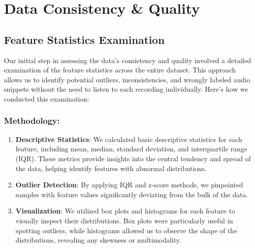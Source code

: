 \section{Data Consistency \& Quality}

\subsection{Feature Statistics Examination}

Our initial step in assessing the data's consistency and quality involved a detailed examination of the feature statistics across the entire dataset. This approach allows us to identify potential outliers, inconsistencies, and wrongly labeled audio snippets without the need to listen to each recording individually. Here's how we conducted this examination:

\subsubsection{Methodology:}

\begin{enumerate}
    \item \textbf{Descriptive Statistics}: We calculated basic descriptive statistics for each feature, including mean, median, standard deviation, and interquartile range (IQR). These metrics provide insights into the central tendency and spread of the data, helping identify features with abnormal distributions.
    \item \textbf{Outlier Detection}: By applying IQR and z-score methods, we pinpointed samples with feature values significantly deviating from the bulk of the data.
    \item \textbf{Visualization}: We utilized box plots and histograms for each feature to visually inspect their distributions. Box plots were particularly useful in spotting outliers, while histograms allowed us to observe the shape of the distributions, revealing any skewness or multimodality.
\end{enumerate}


